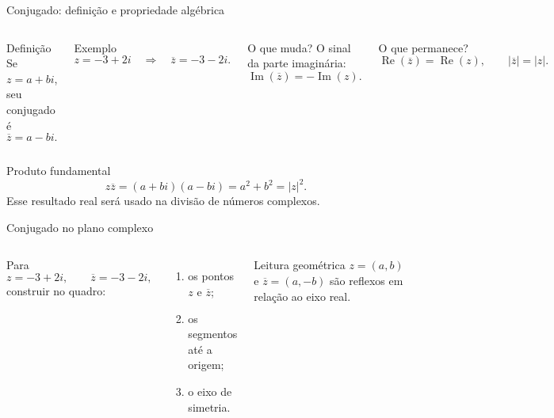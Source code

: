 \documentclass[aspectratio=169]{beamer}
\begin{document}
\begin{frame}{Conjugado: definição e propriedade algébrica}
\vspace{-0.85em}
\small
\begin{columns}[T,onlytextwidth]
\begin{block}{Definição}
Se $z=a+bi$, seu conjugado é
\[
  \overline z=a-bi.
\]
\end{block}

\begin{block}{Exemplo}
\[
  z=-3+2i
  \quad\Longrightarrow\quad
  \overline z=-3-2i.
\]
\end{block}

\begin{block}{O que muda?}
O sinal da parte imaginária:
\[
  \operatorname{Im}(\overline z)=-\operatorname{Im}(z).
\]
\end{block}

\begin{block}{O que permanece?}
\[
  \operatorname{Re}(\overline z)=\operatorname{Re}(z),
  \qquad |\overline z|=|z|.
\]
\end{block}
\end{columns}

\begin{alertblock}{Produto fundamental}
\[
  z\overline z=(a+bi)(a-bi)=a^2+b^2=|z|^2.
\]
Esse resultado real será usado na divisão de números complexos.
\end{alertblock}
\end{frame}

\begin{frame}{Conjugado no plano complexo}
\vspace{-1cm}
\begin{columns}[T,onlytextwidth]
\small
Para
\[
  z=-3+2i,
  \qquad
  \overline z=-3-2i,
\]
construir no quadro:
\begin{enumerate}
  \item os pontos $z$ e $\overline z$;
  \item os segmentos até a origem;
  \item o eixo de simetria.
\end{enumerate}

\begin{block}{Leitura geométrica}
$z=(a,b)$ e $\overline z=(a,-b)$ são reflexos em relação ao eixo real.
\end{block}

\centering

\end{columns}
\end{frame}
\end{document}
